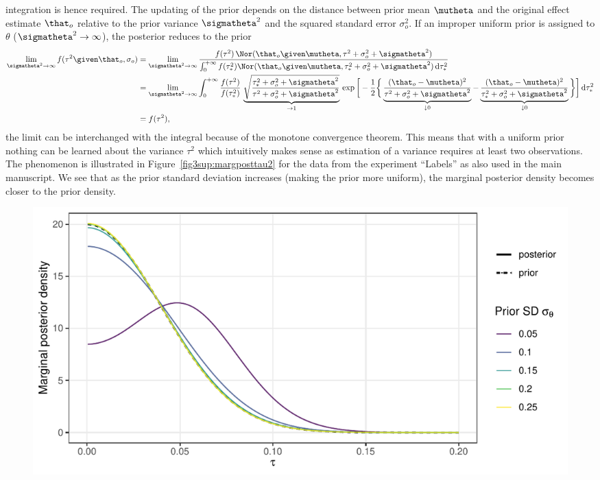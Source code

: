 \begin{subappendices}
integration is hence required. The updating of the prior depends on the distance
between prior mean $\mutheta$ and the original effect estimate $\that_{o}$
relative to the prior variance $\sigmatheta^{2}$ and the squared standard error
$\sigma_{o}^{2}$. If an improper uniform prior is assigned to $\theta$
($\sigmatheta^{2} \to \infty$), the posterior reduces to the prior
\begin{align*}
  \lim_{\sigmatheta^{2} \to \infty} f(\tau^{2} \given \that_{o}, \sigma_{o})
  &= \lim_{\sigmatheta^{2} \to \infty} \frac{f(\tau^{2}) \, \Nor(\that_{o} \given \mutheta, \tau^{2}
    + \sigma^{2}_{o} + \sigmatheta^{2})
    }{\int_{0}^{+\infty} f(\tau^{2}_{*})
    \Nor(\that_{o} \given \mutheta, \tau^{2}_{*} + \sigma^{2}_{o} + \sigmatheta^{2}) \,
    \text{d}\tau^{2}_{*}} \\
  &= \lim_{\sigmatheta^{2} \to \infty}  \int_{0}^{+\infty} \frac{f(\tau^{2})}{f(\tau^{2}_{*})} \,
    \underbrace{\sqrt{\frac{\tau^{2}_{*} + \sigma^{2}_{o} + \sigmatheta^{2}}{\tau^{2} + \sigma^{2}_{o} +
    \sigmatheta^{2}}}}_{\to 1} \, \exp\bigg[-\frac{1}{2}\bigg\{\underbrace{
    \frac{(\that_{o} - \mutheta)^{2}}{\tau^{2} + \sigma^{2}_{o} + \sigmatheta^{2}}}_{\downarrow 0} -
    \underbrace{\frac{(\that_{o} - \mutheta)^{2}}{\tau^{2}_{*} + \sigma^{2}_{o} +
    \sigmatheta^{2}}}_{\downarrow 0} \bigg\}\bigg] \, \text{d}\tau^{2}_{*} \\
  &= f(\tau^{2}),
\end{align*}
the limit can be interchanged with the integral because of the monotone
convergence theorem. This means that with a uniform prior nothing can be learned
about the variance $\tau^{2}$ which intuitively makes sense as estimation of a
variance requires at least two observations. The phenomenon is illustrated in
Figure~\ref{fig3sup:margposttau2} for the data from the experiment ``Labels''
\citep{Protzko2020} as also used in the main manuscript. We see that as the
prior standard deviation increases (making the prior more uniform), the marginal
posterior density becomes closer to the prior density.
\begin{figure}[!htb]
\begin{knitrout}
\color{fgcolor}
\includegraphics[width=\maxwidth]{images/paper3/sup-tau-random-example-1}

\end{knitrout}
\end{figure}
\end{subappendices}
